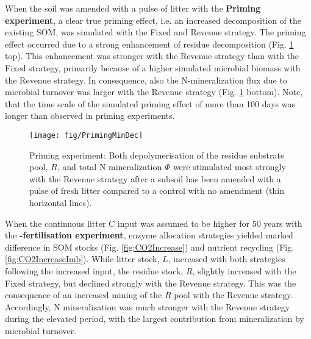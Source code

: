 When the soil was amended with a pulse of litter with the \textbf{Priming
experiment}, a clear true priming effect, i.e. an increased decomposition of the
existing SOM, was simulated with the Fixed and Revenue strategy.
The priming effect occurred due to a strong enhancement of residue decomposition
(Fig. \ref{fig:PrimingMinDec} top). This enhancement was stronger with the
Revenue strategy than with the Fixed strategy, primarily because of a higher
simulated microbial biomass with the Revenue strategy. In consequence, also the
N-mineralization flux due to microbial turnover was larger with the Revenue
strategy (Fig. \ref{fig:PrimingMinDec} bottom).
Note, that the time scale of the simulated priming effect of more than 100 days
was longer than observed in priming experiments.

\begin{figure}[t] \vspace*{2mm}
\begin{center}
\texttt{[image: fig/PrimingMinDec]}
\end{center}
\caption{
Priming experiment: Both depolymerisation of the residue substrate pool, $R$,
and total N mineralization $\Phi$ were stimulated most strongly with the Revenue strategy
after a subsoil has been amended with a pulse of fresh litter 
compared to a control with no amendment (thin horizontal lines).
\label{fig:PrimingMinDec}}
\end{figure}

When the continuous litter C input was assumed to be higher for 50 years with
the \textbf{-fertilisation experiment}, enzyme allocation strategies
yielded marked difference in SOM stocks (Fig. \ref{fig:CO2Increase}) and
nutrient recycling (Fig. \ref{fig:CO2IncreaseImb}).
While litter stock, $L$, increased with both strategies following the increased
input, the residue stock, $R$, slightly increased with the Fixed strategy, but
declined strongly with the Revenue strategy. This was the consequence of an
increased mining of the $R$ pool with the Revenue strategy. Accordingly, N
mineralization was much stronger with the Revenue strategy during the elevated
 period, with the largest contribution from mineralization by
microbial turnover. 

